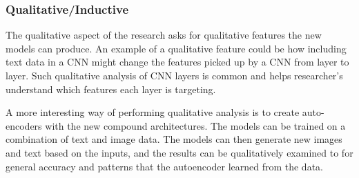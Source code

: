 \subsubsection{Qualitative/Inductive}

The qualitative aspect of the research asks for qualitative features the new models can produce.  An example of a qualitative feature could be how including text data in a CNN might change the features picked up by a CNN from layer to layer.  Such qualitative analysis of CNN layers is common and helps researcher's understand which features each layer is targeting.

A more interesting way of performing qualitative analysis is to create auto-encoders with the new compound architectures.  The models can be trained on a combination of text and image data.  The models can then generate new images and text based on the inputs, and the results can be qualitatively examined to for general accuracy and patterns that the autoencoder learned from the data.  
